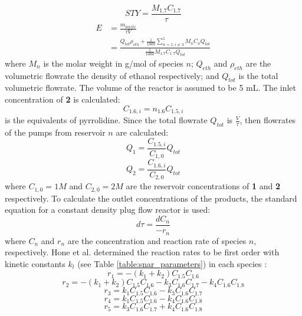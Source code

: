 \begin{equation}
    \label{sty}
	STY = \frac{M_{1.7} C_{1.7}}{\tau}
\end{equation}
\begin{equation}
    \label{e_factor}
	\begin{split}
	 E & = \frac{m_{waste}}{\tau V} \\ 
	   & = \frac{Q_{tot}\rho_{eth} + \frac{1}{1000}\sum_{n=1, i \neq 3}^5 M_nC_nQ_{tot}}{\frac{1}{1000}M_{1.7}C_{1.7}Q_{tot}}		
	\end{split}
\end{equation}
where $M_n$ is the molar weight in g/mol of species $n$; $Q_{eth}$ and $\rho_{eth}$ are the volumetric flowrate the density of ethanol respectively; and $Q_{tot}$ is the total volumetric flowrate. The volume of the reactor is assumed to be 5 mL. The inlet concentration of \textbf{2} is calculated:
\begin{equation}
    C_{1.6,i} = n_{1.6} C_{1.5,i}
\end{equation}
is the equivalents of pyrrolidine. Since the total flowrate $Q_{tot}$ is $\frac{V}{\tau}$, then flowrates of the pumps from reservoir $n$ are calculated:
\begin{equation}
    Q_1 = \frac{C_{1.5,i}}{C_{1,0}}Q_{tot}
\end{equation}
\begin{equation}
    Q_2 = \frac{C_{1.6,i}}{C_{2,0}}Q_{tot}
\end{equation}
where $C_{1,0}=1 M$ and $C_{2,0}=2 M$ are the reservoir concentrations of \textbf{1} and \textbf{2} respectively. To calculate the outlet concentrations of the products, the standard equation for a constant density plug flow reactor is used:
\begin{equation}
	\label{pfr}
	d\tau = \frac{dC_n}{- r_n}
\end{equation}
where $C_n$ and $r_n$ are the concentration and reaction rate of species $n$, respectively. Hone et al. determined the reaction rates to be first order with kinetic constants $k_l$ (see Table \ref{table:snar_parameters}) in each species \cite{Hone2017}:
\begin{equation}
    \label{equation:r_1}
	r_{1} = -(k_1+k_2)C_{1.5}C_{1.6}	
\end{equation}
\begin{equation}
	r_2 = -(k_1+k_2)C_{1.5}C_{1.6}-k_3C_{1.6}C_{1.7}-k_4C_{1.6}C_{1.8}
\end{equation}
\begin{equation}
	r_3 = k_1C_{1.5}C_{1.6}-k_3C_{1.6}C_{1.7}
\end{equation}
\begin{equation}
	r_4 = k_1C_{1.5}C_{1.6}-k_4C_{1.6}C_{1.8}
	\label{equation:r_4}
\end{equation}
\begin{equation}
	\label{last_snar_rxn_rate}
	r_5 = k_3C_{1.6}C_{1.7} + k_4C_{1.6}C_{1.8}
\end{equation}

